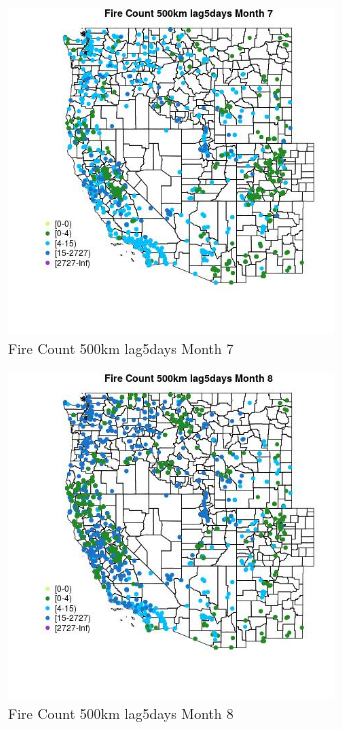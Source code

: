 \begin{figure} 
\centering  
\includegraphics[width=0.77\textwidth]{Code_Outputs/Report_ML_input_PM25_Step4_part_f_de_duplicated_aveswNAs_MapObsMo7Fire_Count_500km_lag5days.jpg} 
\caption{\label{fig:Report_ML_input_PM25_Step4_part_f_de_duplicated_aveswNAsMapObsMo7Fire_Count_500km_lag5days}Fire Count 500km lag5days Month 7} 
\end{figure} 
 

\begin{figure} 
\centering  
\includegraphics[width=0.77\textwidth]{Code_Outputs/Report_ML_input_PM25_Step4_part_f_de_duplicated_aveswNAs_MapObsMo8Fire_Count_500km_lag5days.jpg} 
\caption{\label{fig:Report_ML_input_PM25_Step4_part_f_de_duplicated_aveswNAsMapObsMo8Fire_Count_500km_lag5days}Fire Count 500km lag5days Month 8} 
\end{figure} 
 

